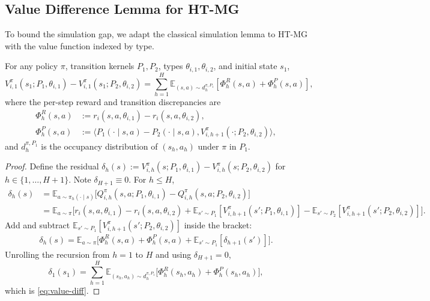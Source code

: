 \subsection{Value Difference Lemma for HT-MG}

To bound the simulation gap, we adapt the classical simulation lemma \citep{kearns2002near,bai2020provable} to HT-MG with the value function indexed by type.

\begin{lemma}
\label{lem:value-diff}
For any policy $\pi$, transition kernels $P_1, P_2$, types $\theta_{i,1}, \theta_{i,2}$, and initial state $s_1$,
\begin{equation}
\label{eq:value-diff}
V_{i,1}^{\pi}(s_1; P_1, \theta_{i,1}) - V_{i,1}^{\pi}(s_1; P_2, \theta_{i,2}) = \sum_{h=1}^{H} \mathbb{E}_{(s,a) \sim d_h^{\pi, P_1}}\left[\Phi_h^R(s,a) + \Phi_h^P(s,a)\right],
\end{equation}
where the per-step reward and transition discrepancies are
\begin{align}
\Phi_h^R(s,a) &:= r_i(s, a, \theta_{i,1}) - r_i(s, a, \theta_{i,2}), \label{eq:phi-r}\\
\Phi_h^P(s,a) &:= \big\langle P_1(\cdot \mid s, a) - P_2(\cdot \mid s, a), V_{i,h+1}^{\pi}(\cdot; P_2, \theta_{i,2})\big\rangle, \label{eq:phi-p}
\end{align}
and $d_h^{\pi, P_1}$ is the occupancy distribution of $(s_h, a_h)$ under $\pi$ in $P_1$.
\end{lemma}

\begin{proof}
Define the residual $\delta_h(s) := V_{i,h}^\pi(s; P_1, \theta_{i,1}) - V_{i,h}^\pi(s; P_2, \theta_{i,2})$ for $h \in \{1, \ldots, H+1\}$. Note $\delta_{H+1} \equiv 0$. For $h \leq H$,
\begin{align}
\delta_h(s) &= \mathbb{E}_{a \sim \pi_h(\cdot \mid s)}\big[Q_{i,h}^\pi(s, a; P_1, \theta_{i,1}) - Q_{i,h}^\pi(s, a; P_2, \theta_{i,2})\big] \\
&= \mathbb{E}_{a \sim \pi}\big[r_i(s, a, \theta_{i,1}) - r_i(s, a, \theta_{i,2}) + \mathbb{E}_{s' \sim P_1}[V_{i,h+1}^\pi(s'; P_1, \theta_{i,1})] - \mathbb{E}_{s' \sim P_2}[V_{i,h+1}^\pi(s'; P_2, \theta_{i,2})]\big].
\end{align}
Add and subtract $\mathbb{E}_{s' \sim P_1}[V_{i,h+1}^\pi(s'; P_2, \theta_{i,2})]$ inside the bracket:
\begin{align}
\delta_h(s) = \mathbb{E}_{a \sim \pi}\big[\Phi_h^R(s,a) + \Phi_h^P(s,a) + \mathbb{E}_{s' \sim P_1}[\delta_{h+1}(s')]\big].
\end{align}
Unrolling the recursion from $h=1$ to $H$ and using $\delta_{H+1} = 0$,
\begin{equation}
\delta_1(s_1) = \sum_{h=1}^H \mathbb{E}_{(s_h, a_h) \sim d_h^{\pi, P_1}}\big[\Phi_h^R(s_h, a_h) + \Phi_h^P(s_h, a_h)\big],
\end{equation}
which is \eqref{eq:value-diff}.
\end{proof}

